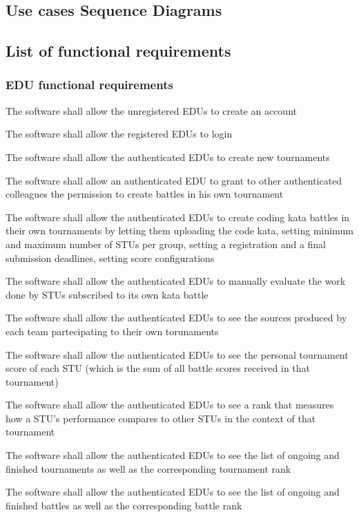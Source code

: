 \subsection{Use cases Sequence Diagrams}

\subsection{List of functional requirements}
\subsubsection*{EDU functional requirements}
\begin{requirementsenumerate}
    \item The software shall allow the unregistered EDUs to create an account
    \item The software shall allow the registered EDUs to login
    \item The software shall allow the authenticated EDUs to create new tournaments
    \item The software shall allow an authenticated EDU to grant to other authenticated colleagues the permission to create battles in his own tournament
    \item The software shall allow the authenticated EDUs to create coding kata battles in their own tournaments by letting them uploading the code kata, setting minimum and maximum number of STUs per group, setting a registration and a final submission deadlines, setting score configurations
    \item The software shall allow the authenticated EDUs to manually evaluate the work done by STUs subscribed to its own kata battle
    \item The software shall allow the authenticated EDUs to see the sources produced by each team partecipating to their own torunaments
    \item The software shall allow the authenticated EDUs to see the personal tournament score of each STU (which is the sum of all battle scores received in that tournament)
    \item The software shall allow the authenticated EDUs to see a rank that measures how a STU's performance compares to other STUs in the context of that tournament
    \item The software shall allow the authenticated EDUs to see the list of ongoing and finished tournaments as well as the corresponding tournament rank
    \item The software shall allow the authenticated EDUs to see the list of ongoing and finished battles as well as the corresponding battle rank

\end{requirementsenumerate}
